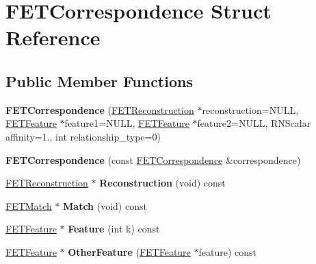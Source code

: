 \hypertarget{struct_f_e_t_correspondence}{}\section{F\+E\+T\+Correspondence Struct Reference}
\label{struct_f_e_t_correspondence}
\subsection*{Public Member Functions}
\begin{DoxyCompactItemize}
\item 
{\bfseries F\+E\+T\+Correspondence} (\hyperlink{struct_f_e_t_reconstruction}{F\+E\+T\+Reconstruction} $\ast$reconstruction=N\+U\+LL, \hyperlink{struct_f_e_t_feature}{F\+E\+T\+Feature} $\ast$feature1=N\+U\+LL, \hyperlink{struct_f_e_t_feature}{F\+E\+T\+Feature} $\ast$feature2=N\+U\+LL, R\+N\+Scalar affinity=1., int relationship\+\_\+type=0)\hypertarget{struct_f_e_t_correspondence_ac77a20edbdafb7062351826653f7a7e6}{}\label{struct_f_e_t_correspondence_ac77a20edbdafb7062351826653f7a7e6}

\item 
{\bfseries F\+E\+T\+Correspondence} (const \hyperlink{struct_f_e_t_correspondence}{F\+E\+T\+Correspondence} \&correspondence)\hypertarget{struct_f_e_t_correspondence_ab63a809822c9924e59905d9ce19a63d3}{}\label{struct_f_e_t_correspondence_ab63a809822c9924e59905d9ce19a63d3}

\item 
\hyperlink{struct_f_e_t_reconstruction}{F\+E\+T\+Reconstruction} $\ast$ {\bfseries Reconstruction} (void) const \hypertarget{struct_f_e_t_correspondence_a8ce5c8141796d2e7ebe7abec9f9c2470}{}\label{struct_f_e_t_correspondence_a8ce5c8141796d2e7ebe7abec9f9c2470}

\item 
\hyperlink{struct_f_e_t_match}{F\+E\+T\+Match} $\ast$ {\bfseries Match} (void) const \hypertarget{struct_f_e_t_correspondence_a7c561a50babd4a7b1e5964053cdeb659}{}\label{struct_f_e_t_correspondence_a7c561a50babd4a7b1e5964053cdeb659}

\item 
\hyperlink{struct_f_e_t_feature}{F\+E\+T\+Feature} $\ast$ {\bfseries Feature} (int k) const \hypertarget{struct_f_e_t_correspondence_ac752caadd162edaed78a192927916b06}{}\label{struct_f_e_t_correspondence_ac752caadd162edaed78a192927916b06}

\item 
\hyperlink{struct_f_e_t_feature}{F\+E\+T\+Feature} $\ast$ {\bfseries Other\+Feature} (\hyperlink{struct_f_e_t_feature}{F\+E\+T\+Feature} $\ast$feature) const \hypertarget{struct_f_e_t_correspondence_a78380b26eda56588adb27187d64c5a57}{}\label{struct_f_e_t_correspondence_a78380b26eda56588adb27187d64c5a57}


\end{DoxyCompactItemize}
